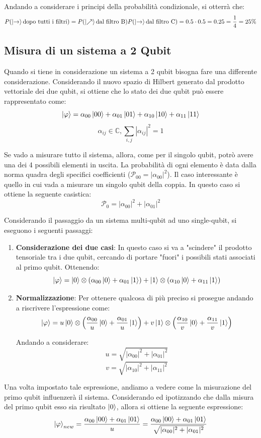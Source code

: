 Andando a considerare i principi della probabilità condizionale, si otterrà che:
\[
P(\ket{\rightarrow}\text{dopo tutti i filtri}) = P(\ket{\nearrow} \text{dal filtro B})P(\ket{\rightarrow} \text{dal filtro C})= 0.5 \cdot 0.5 = 0.25 = \frac{1}{4} = 25\%
\]

\subsection{Misura di un sistema a 2 Qubit}
Quando si tiene in considerazione un sistema a 2 qubit bisogna fare una differente considerazione.
Considerando il nuovo spazio di Hilbert generato dal prodotto vettoriale dei due qubit, si ottiene che lo stato dei due qubit può essere rappresentato come:
\[
\ket{\varphi} = \alpha_{00} \ket{00} + \alpha_{01} \ket{01} + \alpha_{10} \ket{10} + \alpha_{11} \ket{11}
\]
\[
\alpha_{ij} \in \mathbb{C}, \sum_{i,j}|\alpha_{ij}|^2=1
\]

Se vado a misurare tutto il sistema, allora, come per il singolo qubit, potrò avere una dei 4 possibili elementi in uscita. La probabilità di ogni elemento è data dalla norma quadra degli specifici coefficienti (\(\mathcal{P}_{00} = |\alpha_{00}|^2\)). Il caso interessante è quello in cui vada a misurare un singolo qubit della coppia. In questo caso si ottiene la seguente casistica:
\[
\mathcal{P}_0 = |\alpha_{00}|^2 + |\alpha_{01}|^2
\]

Considerando il passaggio da un sistema multi-qubit ad uno single-qubit, si eseguono i seguenti passaggi:
\begin{enumerate}
  \item \textbf{Considerazione dei due casi}: In questo caso si va a "scindere" il prodotto tensoriale tra i due qubit, cercando di portare "fuori" i possibili stati associati al primo qubit. Ottenendo:
  \[
  \ket{\varphi} = \ket{0} \otimes (\alpha_{00} \ket{0} + \alpha_{01}\ket{1}) + \ket{1} \otimes (\alpha_{10} \ket{0} + \alpha_{11}\ket{1})
  \]

  \item \textbf{Normalizzazione}: Per ottenere qualcosa di più preciso si prosegue andando a riscrivere l'espressione come:
  \[
  \ket{\varphi} = u \ket{0} \otimes \left(\frac{\alpha_{00}}{u} \ket{0} + \frac{\alpha_{01}}{u}\ket{1}\right) + v\ket{1} \otimes \left(\frac{\alpha_{10}}{v} \ket{0} + \frac{\alpha_{11}}{v}\ket{1}\right)
  \]

  Andando a considerare:
  \[
  u = \sqrt{|\alpha_{00}|^2 + |\alpha_{01}|^2}
  \]
  \[
  v = \sqrt{|\alpha_{10}|^2 + |\alpha_{11}|^2}
  \]
\end{enumerate}

Una volta impostato tale espressione, andiamo a vedere come la misurazione del primo qubit influenzerà il sistema. Considerando ed ipotizzando che dalla misura del primo qubit esso sia risultato \(\ket{0}\), allora si ottiene la seguente espressione:
\[
\ket{\varphi}_{new} = \frac{\alpha_{00} \ket{00} + \alpha_{01} \ket{01}}{u} =  \frac{\alpha_{00} \ket{00} + \alpha_{01} \ket{01}}{\sqrt{|\alpha_{00}|^2 + |\alpha_{01}|^2}}
\]